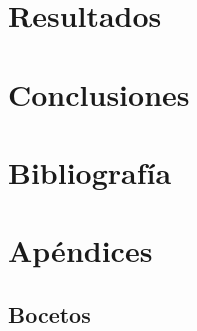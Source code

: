 \documentclass[a4paper]{article}
\begin{document}
\section{Resultados}

\section{Conclusiones}

\section{Bibliografía}

\appendix

\section{Apéndices}

\subsection{Bocetos}
\label{bocetos}
\end{document}
